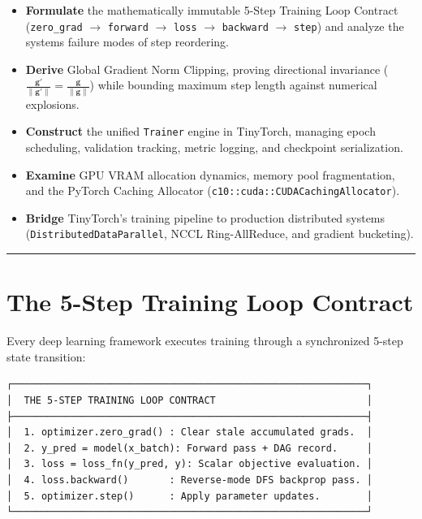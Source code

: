 \documentclass[
  letterpaper,
]{scrbook}
\providecommand{\tightlist}{%
  \setlength{\itemsep}{0pt}\setlength{\parskip}{0pt}}
\begin{document}
\begin{itemize}
\tightlist
\item
  \textbf{Formulate} the mathematically immutable 5-Step Training Loop
  Contract (\texttt{zero\_grad} \(\to\) \texttt{forward} \(\to\)
  \texttt{loss} \(\to\) \texttt{backward} \(\to\) \texttt{step}) and
  analyze the systems failure modes of step reordering.
\item
  \textbf{Derive} Global Gradient Norm Clipping, proving directional
  invariance
  (\(\frac{\mathbf{g}'}{\|\mathbf{g}'\|} = \frac{\mathbf{g}}{\|\mathbf{g}\|}\))
  while bounding maximum step length against numerical explosions.
\item
  \textbf{Construct} the unified \texttt{Trainer} engine in TinyTorch,
  managing epoch scheduling, validation tracking, metric logging, and
  checkpoint serialization.
\item
  \textbf{Examine} GPU VRAM allocation dynamics, memory pool
  fragmentation, and the PyTorch Caching Allocator
  (\texttt{c10::cuda::CUDACachingAllocator}).
\item
  \textbf{Bridge} TinyTorch's training pipeline to production
  distributed systems (\texttt{DistributedDataParallel}, NCCL
  Ring-AllReduce, and gradient bucketing).
\end{itemize}

\begin{center}\rule{0.5\linewidth}{0.5pt}\end{center}

\section{The 5-Step Training Loop
Contract}\label{the-5-step-training-loop-contract}

Every deep learning framework executes training through a synchronized
5-step state transition:

\begin{verbatim}
┌─────────────────────────────────────────────────────────────┐
│  THE 5-STEP TRAINING LOOP CONTRACT                          │
├─────────────────────────────────────────────────────────────┤
│  1. optimizer.zero_grad() : Clear stale accumulated grads.  │
│  2. y_pred = model(x_batch): Forward pass + DAG record.     │
│  3. loss = loss_fn(y_pred, y): Scalar objective evaluation. │
│  4. loss.backward()       : Reverse-mode DFS backprop pass. │
│  5. optimizer.step()      : Apply parameter updates.        │
└─────────────────────────────────────────────────────────────┘
\end{verbatim}
\end{document}
